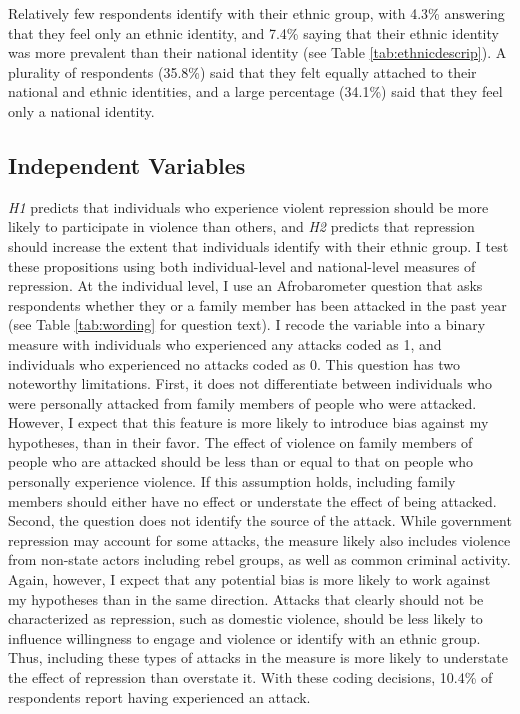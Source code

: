 \documentclass[12pt,]{book}
\theoremstyle{definition}
\theoremstyle{definition}
\theoremstyle{definition}
\theoremstyle{remark}
\begin{document}
Relatively few respondents identify with their ethnic group, with 4.3\%
answering that they feel only an ethnic identity, and 7.4\% saying that
their ethnic identity was more prevalent than their national identity
(see Table \ref{tab:ethnicdescrip}). A plurality of respondents (35.8\%)
said that they felt equally attached to their national and ethnic
identities, and a large percentage (34.1\%) said that they feel only a
national identity.

\hypertarget{independent-variables}{%
\subsection{Independent Variables}\label{independent-variables}}

\emph{H1} predicts that individuals who experience violent repression
should be more likely to participate in violence than others, and
\emph{H2} predicts that repression should increase the extent that
individuals identify with their ethnic group. I test these propositions
using both individual-level and national-level measures of repression.
At the individual level, I use an Afrobarometer question that asks
respondents whether they or a family member has been attacked in the
past year (see Table \ref{tab:wording} for question text). I recode the
variable into a binary measure with individuals who experienced any
attacks coded as 1, and individuals who experienced no attacks coded as
0. This question has two noteworthy limitations. First, it does not
differentiate between individuals who were personally attacked from
family members of people who were attacked. However, I expect that this
feature is more likely to introduce bias against my hypotheses, than in
their favor. The effect of violence on family members of people who are
attacked should be less than or equal to that on people who personally
experience violence. If this assumption holds, including family members
should either have no effect or understate the effect of being attacked.
Second, the question does not identify the source of the attack. While
government repression may account for some attacks, the measure likely
also includes violence from non-state actors including rebel groups, as
well as common criminal activity. Again, however, I expect that any
potential bias is more likely to work against my hypotheses than in the
same direction. Attacks that clearly should not be characterized as
repression, such as domestic violence, should be less likely to
influence willingness to engage and violence or identify with an ethnic
group. Thus, including these types of attacks in the measure is more
likely to understate the effect of repression than overstate it. With
these coding decisions, 10.4\% of respondents report having experienced
an attack.
\end{document}
